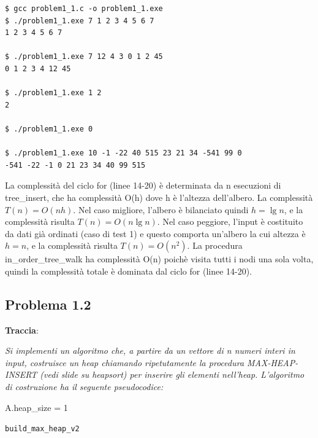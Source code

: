 \documentclass{article}
\begin{document}
\begin{commandline}
\begin{verbatim}
$ gcc problem1_1.c -o problem1_1.exe
$ ./problem1_1.exe 7 1 2 3 4 5 6 7
1 2 3 4 5 6 7

$ ./problem1_1.exe 7 12 4 3 0 1 2 45 
0 1 2 3 4 12 45

$ ./problem1_1.exe 1 2 
2 

$ ./problem1_1.exe 0

$ ./problem1_1.exe 10 -1 -22 40 515 23 21 34 -541 99 0
-541 -22 -1 0 21 23 34 40 99 515
\end{verbatim}
\end{commandline}

\noindent
La complessità del ciclo for (linee 14-20) è determinata da n esecuzioni di tree\_insert, che ha complessità O(h) dove h è l'altezza dell'albero. La complessità $T(n) = O(nh)$. Nel caso migliore, l'albero è bilanciato quindi $h = \lg n$, e la complessità risulta $T(n) = O(n\lg n)$. Nel caso peggiore, l'input è costituito da dati già ordinati (caso di test 1) e questo comporta un'albero la cui altezza è $h = n$, e la complessità risulta $T(n) = O(n^2)$.
La procedura in\_order\_tree\_walk ha complessità O(n) poichè visita tutti i nodi una sola volta, quindi la complessità totale è dominata dal ciclo for (linee 14-20).

\subsection{Problema 1.2} \label{subsec:problema_1_2}
\textbf{Traccia}:

\noindent
\textit{Si implementi un algoritmo che, a partire da un vettore di n numeri interi in input, costruisce un heap chiamando ripetutamente la procedura MAX-HEAP-INSERT (vedi slide su 
heapsort) per inserire gli elementi nell'heap. L'algoritmo di costruzione ha il seguente 
pseudocodice:}

\begin{center}
	\begin{minipage}{0.5\linewidth} %
		\begin{algorithm}[H]
			\medskip

            A.heap\_size = 1 \;
			\caption{\texttt{build\_max\_heap\_v2}} %
			\label{alg:max_heap_v2}   %
		\end{algorithm}
	\end{minipage}
\end{center}
\end{document}
